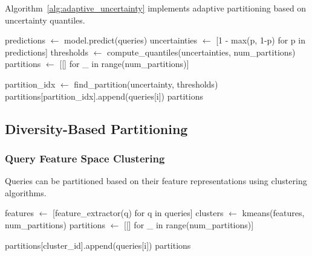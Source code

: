 Algorithm~\ref{alg:adaptive_uncertainty} implements adaptive partitioning based on uncertainty quantiles.

\begin{algorithm}
\caption{Adaptive Uncertainty Partitioning}
\label{alg:adaptive_uncertainty}
\begin{algorithmic}[1]
    \State predictions $\gets$ model.predict(queries)
    \State uncertainties $\gets$ [1 - max(p, 1-p) for p in predictions]
    \State thresholds $\gets$ compute\_quantiles(uncertainties, num\_partitions)
    \State partitions $\gets$ [[] for \_ in range(num\_partitions)]
    
        \State partition\_idx $\gets$ find\_partition(uncertainty, thresholds)
        \State partitions[partition\_idx].append(queries[i])
    \EndFor
    \State \Return partitions
\EndProcedure
\end{algorithmic}
\end{algorithm}

\subsection{Diversity-Based Partitioning}

\subsubsection{Query Feature Space Clustering}

Queries can be partitioned based on their feature representations using clustering algorithms.

\begin{algorithm}
\caption{Diversity-Based Query Partitioning}
\label{alg:diversity_partition}
\begin{algorithmic}[1]
    \State features $\gets$ [feature\_extractor(q) for q in queries]
    \State clusters $\gets$ kmeans(features, num\_partitions)
    \State partitions $\gets$ [[] for \_ in range(num\_partitions)]
    
        \State partitions[cluster\_id].append(queries[i])
    \EndFor
    \State \Return partitions
\EndProcedure
\end{algorithmic}
\end{algorithm}

